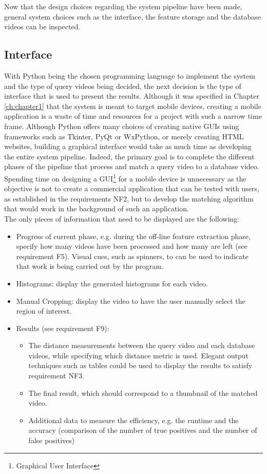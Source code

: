 Now that the design choices regarding the system pipeline have been made, general system choices such as the interface, the feature storage and the database videos can be inspected.


\subsection{Interface}

With Python being the chosen programming language to implement the system and the type of query videos being decided, the next decision is the type of interface that is used to present the results. Although it was specified in Chapter \ref{ch:chapter1} that the system is meant to target mobile devices, creating a mobile application is a waste of time and resources for a project with such a narrow time frame. Although Python offers many choices of creating native GUIs using frameworks such as Tkinter, PyQt or WxPython, or merely creating HTML websites, building a graphical interface would take as much time as developing the entire system pipeline. Indeed, the primary goal is to complete the different phases of the pipeline that process and match a query video to a database video. Spending time on designing a GUI\footnote{Graphical User Interface} for a mobile device is unnecessary as the objective is not to create a commercial application that can be tested with users, as established in the requirements NF2, but to develop the matching algorithm that would work in the background of such an application.\\

The only pieces of information that need to be displayed are the following:
\begin{itemize}
    \item Progress of current phase, e.g. during the off-line feature extraction phase, specify how many videos have been processed and how many are left (see requirement F5). Visual cues, such as spinners, to can be used to indicate that work is being carried out by the program.
    \item Histograms: display the generated histograms for each video.
    \item Manual Cropping: display the video to have the user manually select the region of interest.
    \item Results (see requirement F9):
    \begin{itemize}
        \item The distance measurements between the query video and each database videos, while specifying which distance metric is used. Elegant output techniques such as tables could be used to display the results to satisfy requirement NF3.
        \item The final result, which should correspond to a thumbnail of the matched video.
        \item Additional data to measure the efficiency, e.g. the runtime and the accuracy (comparison of the number of true positives and the number of false positives)
    \end{itemize}
\end{itemize}

